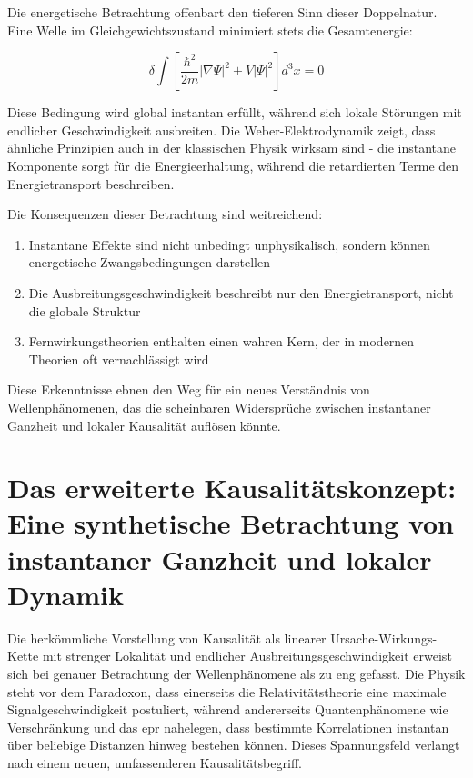 Die energetische Betrachtung offenbart den tieferen Sinn dieser Doppelnatur. Eine Welle im Gleichgewichtszustand minimiert stets die Gesamtenergie:

\begin{equation}
    \delta \int \left[\frac{\hbar^2}{2m}|\nabla\Psi|^2 + V|\Psi|^2\right] d^3x = 0    
\end{equation}

Diese Bedingung wird global instantan erfüllt, während sich lokale Störungen mit endlicher Geschwindigkeit ausbreiten. Die Weber-Elektrodynamik zeigt, dass ähnliche Prinzipien auch in der
klassischen Physik wirksam sind - die instantane Komponente sorgt für die Energieerhaltung, während die retardierten Terme den Energietransport beschreiben.

Die Konsequenzen dieser Betrachtung sind weitreichend:
\begin{enumerate}
    \item Instantane Effekte sind nicht unbedingt unphysikalisch, sondern können energetische Zwangsbedingungen darstellen
    \item Die Ausbreitungsgeschwindigkeit beschreibt nur den Energietransport, nicht die globale Struktur
    \item Fernwirkungstheorien enthalten einen wahren Kern, der in modernen Theorien oft vernachlässigt wird
\end{enumerate}
Diese Erkenntnisse ebnen den Weg für ein neues Verständnis von Wellenphänomenen, das die scheinbaren Widersprüche zwischen instantaner Ganzheit und lokaler Kausalität auflösen könnte.

\section{Das erweiterte Kausalitätskonzept: Eine synthetische Betrachtung von instantaner Ganzheit und lokaler Dynamik}
Die herkömmliche Vorstellung von Kausalität als linearer Ursache-Wirkungs-Kette mit strenger Lokalität und endlicher Ausbreitungsgeschwindigkeit erweist sich bei genauer Betrachtung
der Wellenphänomene als zu eng gefasst. Die Physik steht vor dem Paradoxon, dass einerseits die Relativitätstheorie eine maximale Signalgeschwindigkeit postuliert, während andererseits
Quantenphänomene wie Verschränkung und das \gls{epr} \cite{EPR1935} nahelegen, dass bestimmte Korrelationen instantan über beliebige Distanzen hinweg bestehen können. Dieses Spannungsfeld verlangt
nach einem neuen, umfassenderen Kausalitätsbegriff.

